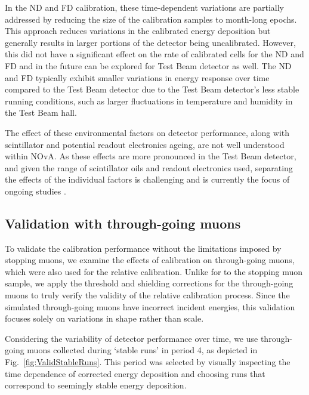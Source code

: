 In the \gls{ND} and \gls{FD} calibration, these time-dependent variations are partially addressed by reducing the size of the calibration samples to month-long epochs. This approach reduces variations in the calibrated energy deposition but generally results in larger portions of the detector being uncalibrated. However, this did not have a significant effect on the rate of calibrated cells for the \gls{ND} and \gls{FD} \cite{NOvA-doc-60838} and in the future can be explored for Test Beam detector as well. The \gls{ND} and \gls{FD} typically exhibit smaller variations in energy response over time compared to the Test Beam detector due to the Test Beam detector's less stable running conditions, such as larger fluctuations in temperature and humidity in the Test Beam hall.

The effect of these environmental factors on detector performance, along with scintillator and potential readout electronics ageing, are not well understood within \gls{NOvA}. As these effects are more pronounced in the Test Beam detector, and given the range of scintillator oils and readout electronics used, separating the effects of the individual factors is challenging and is currently the focus of ongoing studies \cite{NOvA-doc-59591}.

\subsection{Validation with through-going muons}
To validate the calibration performance without the limitations imposed by stopping muons, we examine the effects of calibration on through-going muons, which were also used for the relative calibration. Unlike for to the stopping muon sample, we apply the threshold and shielding corrections for the through-going muons to truly verify the validity of the relative calibration process. Since the simulated through-going muons have incorrect incident energies, this validation focuses solely on variations in shape rather than scale.

Considering the variability of detector performance over time, we use through-going muons collected during `stable runs' in period 4, as depicted in Fig.~\ref{fig:ValidStableRuns}. This period was selected by visually inspecting the time dependence of corrected energy deposition and choosing runs that correspond to seemingly stable energy deposition.

